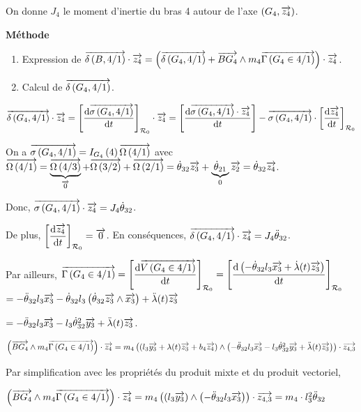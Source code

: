 \documentclass[10pt,fleqn]{article} %
\begin{document}
On donne $J_4$ le moment d'inertie du bras 4 autour de l'axe $\axe{G_4}{z_4}$.

\textbf{Méthode}
\begin{enumerate}
\item Expression de $\vectmd{B}{4}{1}\cdot\vect{z_4} = \left( \vectmd{G_4}{4}{1} + \vect{BG_4}\wedge m_4 \vectg{G_4}{4}{1}\right)\cdot\vect{z_4}$.
\item Calcul de $\vectmd{G_4}{4}{1}$.
\end{enumerate}

$\vectmd{G_4}{4}{1} \cdot\vect{z_4} = \left[ \dfrac{\dd \vectmc{G_4}{4}{1}}{\dd t} \right]_{\rep{0}}\cdot\vect{z_4}
=\left[ \dfrac{\dd \vectmc{G_4}{4}{1}\cdot \vect{z_4}}{\dd t} \right]-\vectmc{G_4}{4}{1}\cdot\left[ \dfrac{\dd \vect{z_4}}{\dd t} \right]_{\rep{0}}$



On a $\vectmc{G_4}{4}{1} =\inertie{G_4}{4} \vecto{4}{1}$ avec $\vecto{4}{1}=\underbrace{\vecto{4}{3}}_{\vect{0}}+\vecto{3}{2}+\vecto{2}{1} =\dot{\theta}_{32} \vect{z_3}+\underbrace{\dot{\theta}_{21}}_{0} \vect{z_2}=\dot{\theta}_{32} \vect{z_4}$.

Donc,
$\vectmc{G_4}{4}{1}\cdot\vect{z_4}=J_4\dot{\theta}_{32} $.

De plus, $ \left[ \dfrac{ \dd \vect{z_4}}{\dd t} \right]_{\rep{0}} = \vect{0} $. 
En conséquences, $\vectmd{G_4}{4}{1} \cdot\vect{z_4}  = J_4\ddot{\theta}_{32}$.

Par ailleurs, $\vectg{G_4}{4}{1}= \left[\dfrac{\dd \vectv{G_4}{4}{1}}{\dd t} \right]_{\rep{0}}=\left[\dfrac{\dd \left( -\dot{\theta}_{32}l_3\vect{x_3}  + \dot{\lambda}(t)\vect{z_3} \right)}{\dd t} \right]_{\rep{0}}$
$= -\ddot{\theta}_{32}l_3\vect{x_3} -\dot{\theta}_{32}l_3    \left(\dot{\theta}_{32} \vect{z_3}\wedge \vect{x_3} \right)  + \ddot{\lambda}(t)\vect{z_3}  $

$= -\ddot{\theta}_{32}l_3\vect{x_3} -l_3   \dot{\theta}_{32}^2  \vect{y_3} + \ddot{\lambda}(t)\vect{z_3}  $.

$\left(\vect{BG_4}\wedge m_4 \vectg{G_4}{4}{1}\right)\cdot\vect{z_4} = 
m_4\left( \left(l_3 \vect{y_3} + \lambda(t) \vect{z_3}+ b_4 \vect{z_4}\right) \wedge  \left(-\ddot{\theta}_{32}l_3\vect{x_3} -l_3   \dot{\theta}_{32}^2  \vect{y_3} + \ddot{\lambda}(t)\vect{z_3} \right) \right)\cdot \vect{z_{4,3}}$

Par simplification avec les propriétés du produit mixte et du produit vectoriel,

$
\left(\vect{BG_4}\wedge m_4 \vectg{G_4}{4}{1}\right)\cdot\vect{z_4} =
m_4\left( \left(l_3 \vect{y_3} \right) \wedge  \left(-\ddot{\theta}_{32}l_3\vect{x_3} \right) \right)\cdot \vect{z_{4,3}}
=m_4\cdot l_3^2\ddot{\theta}_{32}
$
\end{document}
